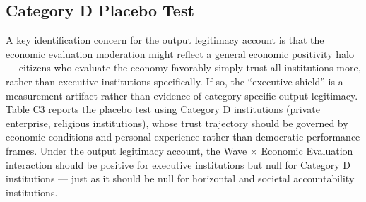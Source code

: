 \documentclass[
  12pt,
  letterpaper]{article}
\begin{document}
\subsection{Category D Placebo Test}\label{sec-placebo}

A key identification concern for the output legitimacy account is that
the economic evaluation moderation might reflect a general economic
positivity halo --- citizens who evaluate the economy favorably simply
trust all institutions more, rather than executive institutions
specifically. If so, the ``executive shield'' is a measurement artifact
rather than evidence of category-specific output legitimacy. Table C3
reports the placebo test using Category D institutions (private
enterprise, religious institutions), whose trust trajectory should be
governed by economic conditions and personal experience rather than
democratic performance frames. Under the output legitimacy account, the
Wave × Economic Evaluation interaction should be positive for executive
institutions but null for Category D institutions --- just as it should
be null for horizontal and societal accountability institutions.
\end{document}
